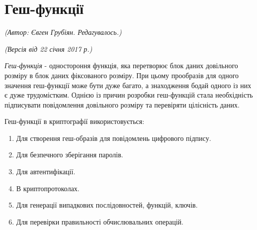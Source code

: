 \section{Геш-функції}
\begin{flushright}
\emph{(Автор: Євген Грубіян. Редагувалось.)}
\par \emph{(Версія від 22 січня 2017 р.)}
\end{flushright}

\textit{Геш-функція} - одностороння функція, яка перетворює блок даних довільного розміру в блок даних фіксованого розміру. При цьому прообразів для одного значення геш-функції може бути дуже багато, а знаходження бодай одного із них є дуже трудомістким. Однією із причин розробки геш-функцій стала необхідність підписувати повідомлення довільного розміру та перевіряти цілісність даних.

Геш-функції в криптографії використовується:
\begin{enumerate}
\item Для створення геш-образів для повідомлень цифрового підпису.
\item Для безпечного зберігання паролів.
\item Для автентифікації.
\item В криптопротоколах.
\item Для генерації випадкових послідовностей, функцій, ключів.
\item Для перевірки правильності обчислювальних операцій.
\end{enumerate}

